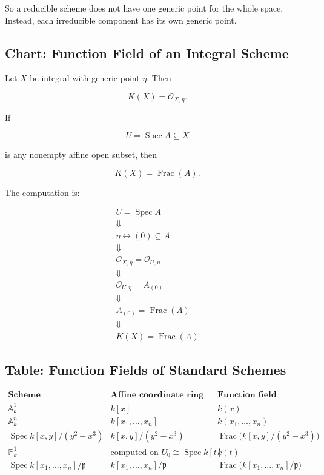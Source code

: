 \documentclass[12pt,a4paper]{article}
\theoremstyle{notespace}
\begin{document}
So a reducible scheme does not have one generic point for the whole space. Instead, each irreducible component has its own generic point.

\subsection{Chart: Function Field of an Integral Scheme}

Let \(X\) be integral with generic point \(\eta\). Then

\[
K(X)=\mathcal{O}_{X,\eta}.
\]

If

\[
U=\operatorname{Spec}A\subseteq X
\]

is any nonempty affine open subset, then

\[
K(X)=\operatorname{Frac}(A).
\]

The computation is:

\[
\begin{array}{c}
	U=\operatorname{Spec}A
	\\[0.5em]
	\Downarrow
	\\[0.5em]
	\eta \leftrightarrow (0)\subseteq A
	\\[0.5em]
	\Downarrow
	\\[0.5em]
	\mathcal{O}_{X,\eta}
	=
	\mathcal{O}_{U,\eta}
	\\[0.5em]
	\Downarrow
	\\[0.5em]
	\mathcal{O}_{U,\eta}
	=
	A_{(0)}
	\\[0.5em]
	\Downarrow
	\\[0.5em]
	A_{(0)}
	=
	\operatorname{Frac}(A)
	\\[0.5em]
	\Downarrow
	\\[0.5em]
	\boxed{
		K(X)=\operatorname{Frac}(A)
	}
\end{array}
\]

\subsection{Table: Function Fields of Standard Schemes}

\[
\begin{array}{c|c|c}
	\textbf{Scheme}
	& \textbf{Affine coordinate ring}
	& \textbf{Function field}
	\\
	\hline
	\mathbb{A}^1_k
	&
	k[x]
	&
	k(x)
	\\
	\hline
	\mathbb{A}^n_k
	&
	k[x_1,\dots,x_n]
	&
	k(x_1,\dots,x_n)
	\\
	\hline
	\operatorname{Spec}k[x,y]/(y^2-x^3)
	&
	k[x,y]/(y^2-x^3)
	&
	\operatorname{Frac}\bigl(k[x,y]/(y^2-x^3)\bigr)
	\\
	\hline
	\mathbb{P}^1_k
	&
	\text{computed on } U_0\cong\operatorname{Spec}k[t]
	&
	k(t)
	\\
	\hline
	\operatorname{Spec}k[x_1,\dots,x_n]/\mathfrak{p}
	&
	k[x_1,\dots,x_n]/\mathfrak{p}
	&
	\operatorname{Frac}\bigl(k[x_1,\dots,x_n]/\mathfrak{p}\bigr)
\end{array}
\]
\end{document}

